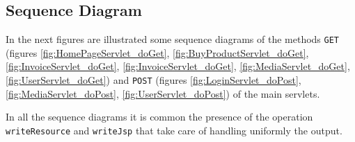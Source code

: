 \subsection{Sequence Diagram}

In the next figures are illustrated some sequence diagrams of the methods 
\texttt{GET} (figures  \ref{fig:HomePageServlet_doGet}, \ref{fig:BuyProductServlet_doGet},
\ref{fig:InvoiceServlet_doGet}, \ref{fig:InvoiceServlet_doGet}, \ref{fig:MediaServlet_doGet}, \ref{fig:UserServlet_doGet})
and  \texttt{POST}  (figures \ref{fig:LoginServlet_doPost}, \ref{fig:MediaServlet_doPost}, \ref{fig:UserServlet_doPost}) of the main servlets.

In all the sequence diagrams  it is common the presence
of the operation \texttt{writeResource} and \texttt{writeJsp} 
that take care of handling uniformly the output.

